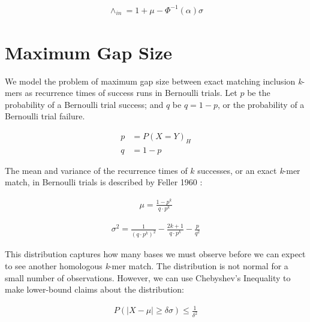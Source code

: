 \documentclass{article}
\begin{document}
\begin{equation}
\begin{split}
  \wedge_{in} = 1 + \mu - \Phi^{-1}(\alpha)\sigma
\end{split}
\end{equation}

\section{Maximum Gap Size}

We model the problem of maximum gap size between exact matching inclusion \textit{k}-mers as recurrence times of success runs in Bernoulli trials. Let \(p\) be the probability of a Bernoulli trial success; and \(q\) be \(q = 1 - p\), or the probability of a Bernoulli trial failure.

\begin{equation}
\begin{split}
  p &= P(X = Y)_{H} \\
  q &= 1 - p
\end{split}
\end{equation}

The mean and variance of the recurrence times of \(k\) successes, or an exact \textit{k}-mer match, in Bernoulli trials is described by Feller 1960 \cite{feller1960}:

\begin{equation}
\begin{split}
  \mu = \frac{1 - p^k}{q \cdot p^k}
\end{split}
\end{equation}

\begin{equation}
\begin{split}
  \sigma^2 = \frac{1}{(q \cdot p^k)^2} - \frac{2k + 1}{q \cdot p^k} - \frac{p}{q^2}
\end{split}
\end{equation}

This distribution captures how many bases we must observe before we can expect to see another homologous \textit{k}-mer match. The distribution is not normal for a small number of observations. However, we can use Chebyshev's Inequality to make lower-bound claims about the distribution:

\begin{equation}
\label{eq:feller}
\begin{split}
  P(|X - \mu| \geq \delta\sigma) \leq \frac{1}{\delta^2}
\end{split}
\end{equation}
\end{document}
